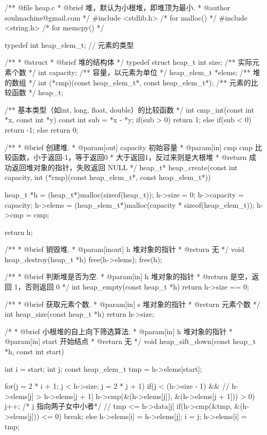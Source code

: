 \begin{Codex}[label=heap.c]
/** @file heap.c
 * @brief 堆，默认为小根堆，即堆顶为最小.
 * @author soulmachine@gmail.com
 */
#include <stdlib.h>  /* for malloc() */
#include <string.h>  /* for memcpy() */

typedef int heap_elem_t; // 元素的类型

/**
 * @struct
 * @brief 堆的结构体
 */
typedef struct heap_t {
    int     size;   /** 实际元素个数 */
    int     capacity; /** 容量，以元素为单位 */
    heap_elem_t  *elems;   /** 堆的数组 */
    int (*cmp)(const heap_elem_t*, const heap_elem_t*);   /** 元素的比较函数 */
}heap_t;


/** 基本类型（如int, long, float, double）的比较函数 */
int cmp_int(const int *x, const int *y) {
    const int sub = *x - *y;
    if(sub > 0) {
        return 1;
    } else if(sub < 0) {
        return -1;
    } else {
        return 0;
    }
}

/**
 * @brief 创建堆.
 * @param[out] capacity 初始容量
 * @param[in] cmp cmp 比较函数，小于返回-1，等于返回0
 *            大于返回1，反过来则是大根堆
 * @return 成功返回堆对象的指针，失败返回 NULL
 */
heap_t* heap_create(const int capacity,
        int (*cmp)(const heap_elem_t*, const heap_elem_t*)) {
    heap_t *h = (heap_t*)malloc(sizeof(heap_t));
    h->size = 0;
    h->capacity = capacity;
    h->elems = (heap_elem_t*)malloc(capacity * sizeof(heap_elem_t));
    h->cmp = cmp;

    return h;
}

/**
 * @brief 销毁堆.
 * @param[inout] h 堆对象的指针
 * @return 无
 */
void heap_destroy(heap_t *h) {
    free(h->elems);
    free(h);
}


/**
 * @brief 判断堆是否为空.
 * @param[in] h 堆对象的指针
 * @return 是空，返回 1，否则返回 0
 */
int heap_empty(const heap_t *h) {
    return h->size == 0;
}

/**
 * @brief 获取元素个数.
 * @param[in] s 堆对象的指针
 * @return 元素个数
 */
int heap_size(const heap_t *h) {
    return h->size;
}

/*
 * @brief 小根堆的自上向下筛选算法.
 * @param[in] h 堆对象的指针
 * @param[in] start 开始结点
 * @return 无
 */
void heap_sift_down(const heap_t *h, const int start) {
    int i = start;
    int j;
    const heap_elem_t tmp = h->elems[start];

    for(j = 2 * i + 1; j < h->size; j = 2 * j + 1) {
        if(j < (h->size - 1) &&
            // h->elems[j] > h->elems[j + 1]
            h->cmp(&(h->elems[j]), &(h->elems[j + 1])) > 0) {
                j++; /* j 指向两子女中小者*/
        }
        // tmp <= h->data[j]
        if(h->cmp(&tmp, &(h->elems[j])) <= 0) {
            break;
        } else {
            h->elems[i] = h->elems[j];
            i = j;
        }
    }
    h->elems[i] = tmp;
}


\end{Codex}
